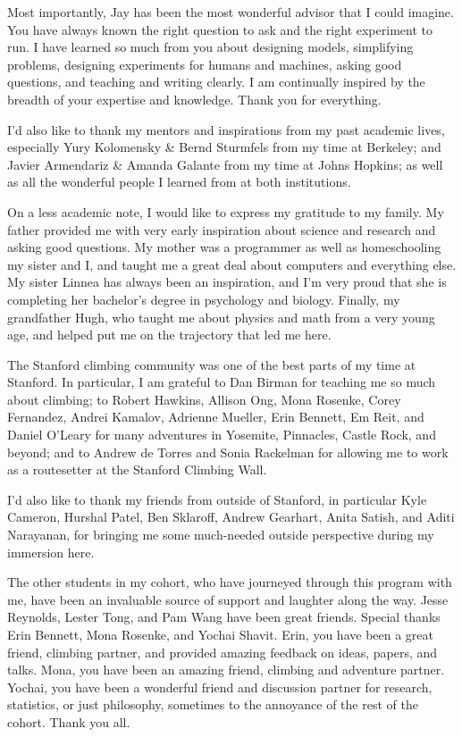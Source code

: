 \documentclass{report}
\begin{document}
Most importantly, Jay has been the most wonderful advisor that I could imagine. You have always known the right question to ask and the right experiment to run. I have learned so much from you about designing models, simplifying problems, designing experiments for humans and machines, asking good questions, and teaching and writing clearly. I am continually inspired by the breadth of your expertise and knowledge. Thank you for everything.

I'd also like to thank my mentors and inspirations from my past academic lives, especially Yury Kolomensky \& Bernd Sturmfels from my time at Berkeley; and Javier Armendariz \& Amanda Galante from my time at Johns Hopkins; as well as all the wonderful people I learned from at both institutions.

On a less academic note, I would like to express my gratitude to my family. My father provided me with very early inspiration about science and research and asking good questions. My mother was a programmer as well as homeschooling my sister and I, and taught me a great deal about computers and everything else. My sister Linnea has always been an inspiration, and I'm very proud that she is completing her bachelor's degree in psychology and biology. Finally, my grandfather Hugh, who taught me about physics and math from a very young age, and helped put me on the trajectory that led me here. 

The Stanford climbing community was one of the best parts of my time at Stanford. In particular, I am grateful to Dan Birman for teaching me so much about climbing; to Robert Hawkins, Allison Ong, Mona Rosenke, Corey Fernandez, Andrei Kamalov, Adrienne Mueller, Erin Bennett, Em Reit, and Daniel O'Leary for many adventures in Yosemite, Pinnacles, Castle Rock, and beyond; and to Andrew de Torres and Sonia Rackelman for allowing me to work as a routesetter at the Stanford Climbing Wall. 

I'd also like to thank my friends from outside of Stanford, in particular Kyle Cameron, Hurshal Patel, Ben Sklaroff, Andrew Gearhart, Anita Satish, and Aditi Narayanan, for bringing me some much-needed outside perspective during my immersion here.

The other students in my cohort, who have journeyed through this program with me, have been an invaluable source of support and laughter along the way. Jesse Reynolds, Lester Tong, and Pam Wang have been great friends. Special thanks Erin Bennett, Mona Rosenke, and Yochai Shavit. Erin, you have been a great friend, climbing partner, and provided amazing feedback on ideas, papers, and talks. Mona, you have been an amazing friend, climbing and adventure partner. Yochai, you have been a wonderful friend and discussion partner for research, statistics, or just philosophy, sometimes to the annoyance of the rest of the cohort. Thank you all. 
\end{document}
